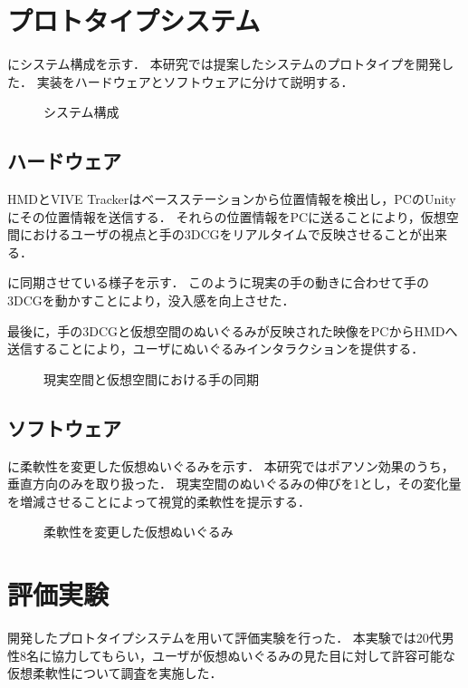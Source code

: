 \documentclass[uplatex]{jsarticle}   %
\begin{document}
\section{プロトタイプシステム}
にシステム構成を示す．
本研究では提案したシステムのプロトタイプを開発した．
実装をハードウェアとソフトウェアに分けて説明する．
\begin{figure}[t]
    \centering
    \caption{システム構成}\label{fig:kousei}
\end{figure}

    \subsection{ハードウェア}
    HMDとVIVE Trackerはベースステーションから位置情報を検出し，PCのUnityにその位置情報を送信する．
    それらの位置情報をPCに送ることにより，仮想空間におけるユーザの視点と手の3DCGをリアルタイムで反映させることが出来る．
    
    に同期させている様子を示す．
    このように現実の手の動きに合わせて手の3DCGを動かすことにより，没入感を向上させた．

    最後に，手の3DCGと仮想空間のぬいぐるみが反映された映像をPCからHMDへ送信することにより，ユーザにぬいぐるみインタラクションを提供する．

    \begin{figure}[t]
        \centering
        \caption{現実空間と仮想空間における手の同期}\label{fig:douki}
    \end{figure}

    \subsection{ソフトウェア}
    に柔軟性を変更した仮想ぬいぐるみを示す．
    本研究ではポアソン効果のうち，垂直方向のみを取り扱った．
    現実空間のぬいぐるみの伸びを1とし，その変化量を増減させることによって視覚的柔軟性を提示する．

    \begin{figure}[t]
        \centering
        \caption{柔軟性を変更した仮想ぬいぐるみ}\label{fig:sinshuku}
    \end{figure}


\section{評価実験}
開発したプロトタイプシステムを用いて評価実験を行った．
本実験では20代男性8名に協力してもらい，ユーザが仮想ぬいぐるみの見た目に対して許容可能な仮想柔軟性について調査を実施した．
\end{document}

